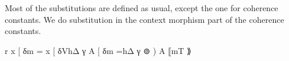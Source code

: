 \documentclass{acm_proc_article-sp}
\begin{document}
Most of the substitutions are defined as usual, except the one for coherence constants. We do
substitution in the context morphism part of the coherence constants.

\begin{code}%
\>r x       [ δ\AgdaFunction{ ]t}m = x [ δ\AgdaFunction{ ]}VhΔ γ A  [ δ\AgdaFunction{ ]t}m =hΔ \AgdaBound{(}γ ⊚ ) A ⟦m\AgdaFunction{ [⊚]}T ⟫
\<%
\end{code}


\end{document}
